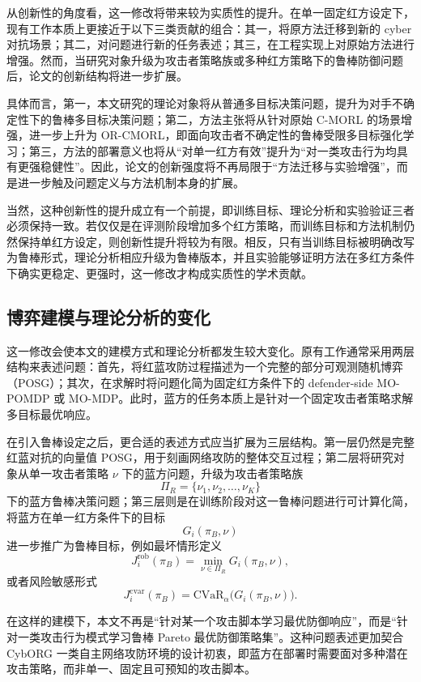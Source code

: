 \documentclass[12pt,a4paper]{article}
\begin{document}
从创新性的角度看，这一修改将带来较为实质性的提升。在单一固定红方设定下，现有工作本质上更接近于以下三类贡献的组合：其一，将原方法迁移到新的 cyber 对抗场景；其二，对问题进行新的任务表述；其三，在工程实现上对原始方法进行增强。然而，当研究对象升级为攻击者策略族或多种红方策略下的鲁棒防御问题后，论文的创新结构将进一步扩展。

具体而言，第一，本文研究的理论对象将从普通多目标决策问题，提升为对手不确定性下的鲁棒多目标决策问题；第二，方法主张将从针对原始 C-MORL 的场景增强，进一步上升为 OR-CMORL，即面向攻击者不确定性的鲁棒受限多目标强化学习；第三，方法的部署意义也将从“对单一红方有效”提升为“对一类攻击行为均具有更强稳健性”。因此，论文的创新强度将不再局限于“方法迁移与实验增强”，而是进一步触及问题定义与方法机制本身的扩展。

当然，这种创新性的提升成立有一个前提，即训练目标、理论分析和实验验证三者必须保持一致。若仅仅是在评测阶段增加多个红方策略，而训练目标和方法机制仍然保持单红方设定，则创新性提升将较为有限。相反，只有当训练目标被明确改写为鲁棒形式，理论分析相应升级为鲁棒版本，并且实验能够证明方法在多红方条件下确实更稳定、更强时，这一修改才构成实质性的学术贡献。

\subsection{博弈建模与理论分析的变化}

这一修改会使本文的建模方式和理论分析都发生较大变化。原有工作通常采用两层结构来表述问题：首先，将红蓝攻防过程描述为一个完整的部分可观测随机博弈（POSG）；其次，在求解时将问题化简为固定红方条件下的 defender-side MO-POMDP 或 MO-MDP。此时，蓝方的任务本质上是针对一个固定攻击者策略求解多目标最优响应。

在引入鲁棒设定之后，更合适的表述方式应当扩展为三层结构。第一层仍然是完整红蓝对抗的向量值 POSG，用于刻画网络攻防的整体交互过程；第二层将研究对象从单一攻击者策略 $\nu$ 下的蓝方问题，升级为攻击者策略族
\[
\Pi_R=\{\nu_1,\nu_2,\dots,\nu_K\}
\]
下的蓝方鲁棒决策问题；第三层则是在训练阶段对这一鲁棒问题进行可计算化简，将蓝方在单一红方条件下的目标
\[
G_i(\pi_B,\nu)
\]
进一步推广为鲁棒目标，例如最坏情形定义
\[
J_i^{\mathrm{rob}}(\pi_B)=\min_{\nu\in\Pi_R} G_i(\pi_B,\nu),
\]
或者风险敏感形式
\[
J_i^{\mathrm{cvar}}(\pi_B)=\mathrm{CVaR}_{\alpha}\bigl(G_i(\pi_B,\nu)\bigr).
\]

在这样的建模下，本文不再是“针对某一个攻击脚本学习最优防御响应”，而是“针对一类攻击行为模式学习鲁棒 Pareto 最优防御策略集”。这种问题表述更加契合 CybORG 一类自主网络攻防环境的设计初衷，即蓝方在部署时需要面对多种潜在攻击策略，而非单一、固定且可预知的攻击脚本\cite{CybORG2020}。
\end{document}
